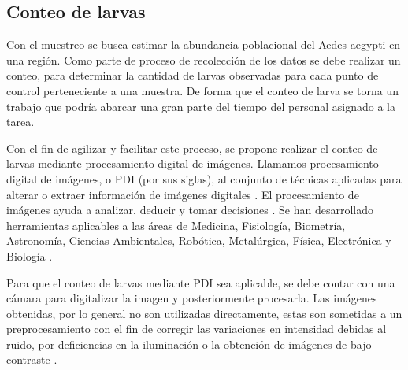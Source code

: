 \subsection{Conteo de larvas}
Con el muestreo se busca estimar la abundancia poblacional del Aedes aegypti en una región. Como
parte de proceso de recolección de los datos se debe realizar un conteo, para determinar la
cantidad de larvas observadas para cada punto de control perteneciente a una muestra. De forma que
el conteo de larva se torna un trabajo que podría abarcar una gran parte del tiempo del personal
asignado a la tarea.

Con el fin de agilizar y facilitar este proceso, se propone realizar el conteo de larvas mediante
procesamiento digital de imágenes. Llamamos procesamiento digital de imágenes, o PDI (por sus
siglas), al conjunto de técnicas aplicadas para alterar o extraer información de imágenes digitales
\cite{moreira2009implementacion, ortiz2013procesamiento}. El procesamiento de imágenes ayuda a
analizar, deducir y tomar decisiones \cite{ortiz2013procesamiento}. Se han desarrollado
herramientas aplicables a las áreas de Medicina, Fisiología, Biometría, Astronomía, Ciencias
Ambientales, Robótica, Metalúrgica, Física, Electrónica y Biología \cite{ortiz2013procesamiento, santillan2008deteccion, moreira2009implementacion}.

Para que el conteo de larvas mediante PDI sea aplicable, se debe contar con una cámara para
digitalizar la imagen y posteriormente procesarla. Las imágenes obtenidas, por lo general no son
utilizadas directamente, estas son sometidas a un preprocesamiento con el fin de corregir las
variaciones en intensidad debidas al ruido, por deficiencias en la iluminación o la obtención de
imágenes de bajo contraste \citep{santillan2008deteccion}.

